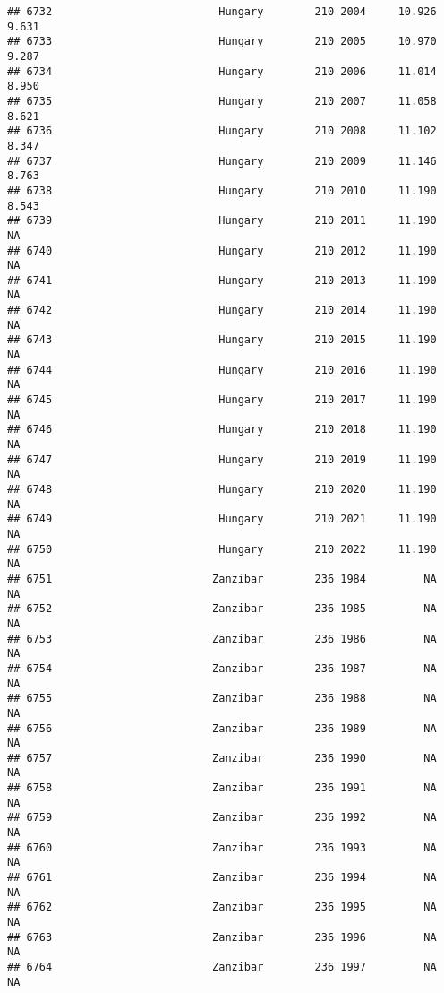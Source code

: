 \documentclass[
]{article}
\begin{document}
\begin{verbatim}
## 6732                          Hungary        210 2004     10.926      9.631
## 6733                          Hungary        210 2005     10.970      9.287
## 6734                          Hungary        210 2006     11.014      8.950
## 6735                          Hungary        210 2007     11.058      8.621
## 6736                          Hungary        210 2008     11.102      8.347
## 6737                          Hungary        210 2009     11.146      8.763
## 6738                          Hungary        210 2010     11.190      8.543
## 6739                          Hungary        210 2011     11.190         NA
## 6740                          Hungary        210 2012     11.190         NA
## 6741                          Hungary        210 2013     11.190         NA
## 6742                          Hungary        210 2014     11.190         NA
## 6743                          Hungary        210 2015     11.190         NA
## 6744                          Hungary        210 2016     11.190         NA
## 6745                          Hungary        210 2017     11.190         NA
## 6746                          Hungary        210 2018     11.190         NA
## 6747                          Hungary        210 2019     11.190         NA
## 6748                          Hungary        210 2020     11.190         NA
## 6749                          Hungary        210 2021     11.190         NA
## 6750                          Hungary        210 2022     11.190         NA
## 6751                         Zanzibar        236 1984         NA         NA
## 6752                         Zanzibar        236 1985         NA         NA
## 6753                         Zanzibar        236 1986         NA         NA
## 6754                         Zanzibar        236 1987         NA         NA
## 6755                         Zanzibar        236 1988         NA         NA
## 6756                         Zanzibar        236 1989         NA         NA
## 6757                         Zanzibar        236 1990         NA         NA
## 6758                         Zanzibar        236 1991         NA         NA
## 6759                         Zanzibar        236 1992         NA         NA
## 6760                         Zanzibar        236 1993         NA         NA
## 6761                         Zanzibar        236 1994         NA         NA
## 6762                         Zanzibar        236 1995         NA         NA
## 6763                         Zanzibar        236 1996         NA         NA
## 6764                         Zanzibar        236 1997         NA         NA

\end{verbatim}
\end{document}
